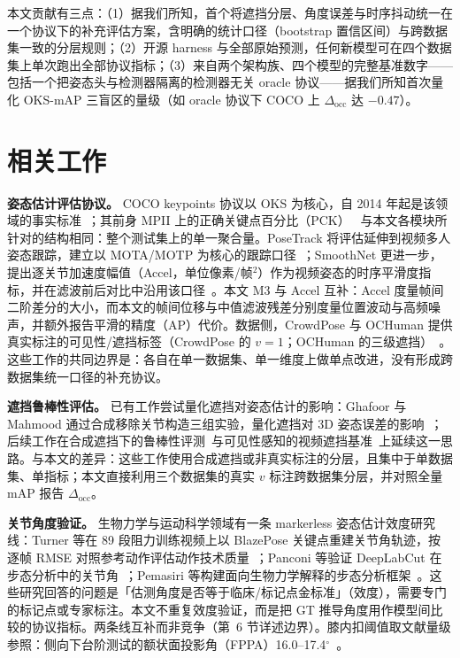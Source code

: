 \documentclass[10pt,conference]{IEEEtran}
\begin{document}
本文贡献有三点：（1）据我们所知，首个将遮挡分层、角度误差与时序抖动统一在一个协议下的补充评估方案，含明确的统计口径（bootstrap 置信区间）与跨数据集一致的分层规则；（2）开源 harness 与全部原始预测，任何新模型可在四个数据集上单次跑出全部协议指标；（3）来自两个架构族、四个模型的完整基准数字——包括一个把姿态头与检测器隔离的检测器无关 oracle 协议——据我们所知首次量化 OKS-mAP 三盲区的量级（如 oracle 协议下 COCO 上 $\Delta_{\mathrm{occ}}$ 达 $-0.47$）。

\section{相关工作}

\textbf{姿态估计评估协议。} COCO keypoints 协议以 OKS 为核心，自 2014 年起是该领域的事实标准~\cite{1}；其前身 MPII 上的正确关键点百分比（PCK）~\cite{16} 与本文各模块所针对的结构相同：整个测试集上的单一聚合量。PoseTrack 将评估延伸到视频多人姿态跟踪，建立以 MOTA/MOTP 为核心的跟踪口径~\cite{3}；SmoothNet 更进一步，提出逐关节加速度幅值（Accel，单位像素/帧$^2$）作为视频姿态的时序平滑度指标，并在滤波前后对比中沿用该口径~\cite{15}。本文 M3 与 Accel 互补：Accel 度量帧间二阶差分的大小，而本文的帧间位移与中值滤波残差分别度量位置波动与高频噪声，并额外报告平滑的精度（AP）代价。数据侧，CrowdPose 与 OCHuman 提供真实标注的可见性/遮挡标签（CrowdPose 的 $v{=}1$；OCHuman 的三级遮挡）~\cite{2,7}。这些工作的共同边界是：各自在单一数据集、单一维度上做单点改进，没有形成跨数据集统一口径的补充协议。

\textbf{遮挡鲁棒性评估。} 已有工作尝试量化遮挡对姿态估计的影响：Ghafoor 与 Mahmood 通过合成移除关节构造三组实验，量化遮挡对 3D 姿态误差的影响~\cite{8}；后续工作在合成遮挡下的鲁棒性评测~\cite{9}与可见性感知的视频遮挡基准~\cite{10}上延续这一思路。与本文的差异：这些工作使用合成遮挡或非真实标注的分层，且集中于单数据集、单指标；本文直接利用三个数据集的真实 $v$ 标注跨数据集分层，并对照全量 mAP 报告 $\Delta_{\mathrm{occ}}$。

\textbf{关节角度验证。} 生物力学与运动科学领域有一条 markerless 姿态估计效度研究线：Turner 等在 89 段阻力训练视频上以 BlazePose 关键点重建关节角轨迹，按逐帧 RMSE 对照参考动作评估动作技术质量~\cite{4}；Panconi 等验证 DeepLabCut 在步态分析中的关节角~\cite{5}；Pemasiri 等构建面向生物力学解释的步态分析框架~\cite{6}。这些研究回答的问题是「估测角度是否等于临床/标记点金标准」（效度），需要专门的标记点或专家标注。本文不重复效度验证，而是把 GT 推导角度用作模型间比较的协议指标。两条线互补而非竞争（第~6 节详述边界）。膝内扣阈值取文献量级参照：侧向下台阶测试的额状面投影角（FPPA）16.0--17.4$^{\circ}$~\cite{11}。
\end{document}
